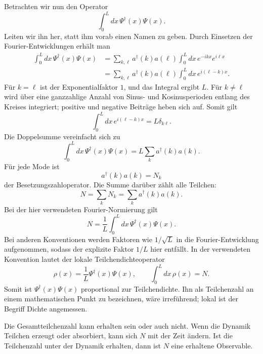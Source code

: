 Betrachten wir nun den Operator
\begin{equation}
\int_0^L dx\,\Psi^\dagger(x)\Psi(x).
\end{equation}
Leiten wir ihn her, statt ihm vorab einen Namen zu geben. Durch Einsetzen der Fourier-Entwicklungen erhält man
\begin{align}
\int_0^L dx\,\Psi^\dagger(x)\Psi(x)
&=
\sum_{k,\ell}a^\dagger(k)a(\ell)
\int_0^L dx\,e^{-ikx}e^{i\ell x}
\\
&=
\sum_{k,\ell}a^\dagger(k)a(\ell)
\int_0^L dx\,e^{i(\ell-k)x}.
\end{align}
Für \(k=\ell\) ist der Exponentialfaktor \(1\), und das Integral ergibt \(L\). Für \(k\ne\ell\) wird über eine ganzzahlige Anzahl von Sinus- und Kosinusperioden entlang des Kreises integriert; positive und negative Beiträge heben sich auf. Somit gilt
\begin{equation}
\int_0^L dx\,e^{i(\ell-k)x}=L\delta_{k\ell}.
\end{equation}
Die Doppelsumme vereinfacht sich zu
\begin{equation}
\int_0^L dx\,\Psi^\dagger(x)\Psi(x)
=L\sum_k a^\dagger(k)a(k).
\end{equation}
Für jede Mode ist
\begin{equation}
a^\dagger(k)a(k)=N_k
\end{equation}
der Besetzungszahloperator. Die Summe darüber zählt alle Teilchen:
\begin{equation}
N=\sum_k N_k=\sum_k a^\dagger(k)a(k).
\end{equation}
Bei der hier verwendeten Fourier-Normierung gilt
\begin{equation}
N=\frac{1}{L}\int_0^L dx\,
\Psi^\dagger(x)\Psi(x).
\end{equation}
Bei anderen Konventionen werden Faktoren wie \(1/\sqrt{L}\) in die Fourier-Entwicklung aufgenommen, sodass der explizite Faktor \(1/L\) hier entfällt. In der verwendeten Konvention lautet der lokale Teilchendichteoperator
\begin{equation}
\rho(x)=\frac{1}{L}\Psi^\dagger(x)\Psi(x),
\qquad
\int_0^L dx\,\rho(x)=N.
\end{equation}
Somit ist \(\Psi^\dagger(x)\Psi(x)\) proportional zur Teilchendichte. Ihn als Teilchenzahl an einem mathematischen Punkt zu bezeichnen, wäre irreführend; lokal ist der Begriff Dichte angemessen.

Die Gesamtteilchenzahl kann erhalten sein oder auch nicht. Wenn die Dynamik Teilchen erzeugt oder absorbiert, kann sich \(N\) mit der Zeit ändern. Ist die Teilchenzahl unter der Dynamik erhalten, dann ist \(N\) eine erhaltene Observable.

